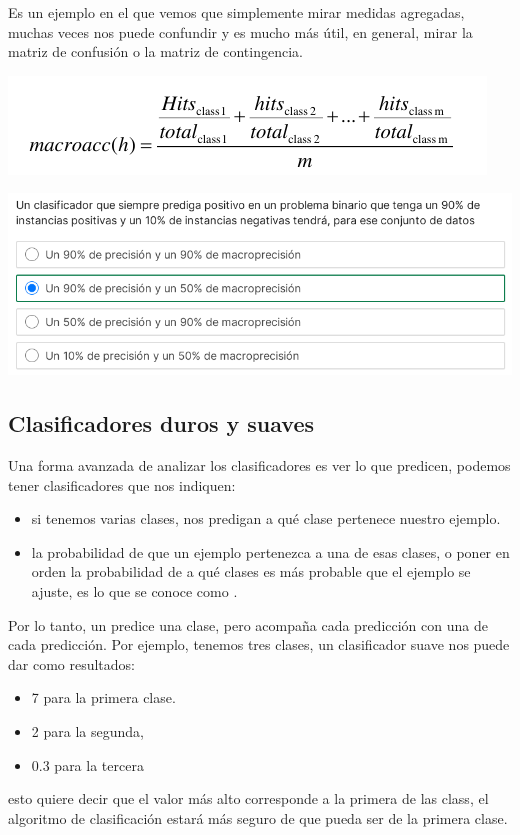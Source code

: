 Es un ejemplo en el que vemos que simplemente mirar medidas agregadas, muchas veces nos puede confundir y es mucho más útil, en general, mirar la matriz de confusión o la matriz de contingencia.
\begin{center}
    \includegraphics[scale=.75]{images/mod02-15.png}
\end{center}

\begin{center}
    \includegraphics[scale=.75]{images/mod02-16.png}
\end{center}

\subsection{Clasificadores duros y suaves}

Una forma avanzada de analizar los clasificadores es ver lo que predicen, podemos tener clasificadores que nos indiquen:
\begin{itemize}
    \item si tenemos varias clases, nos predigan a qué clase pertenece nuestro ejemplo.
    \item la probabilidad de que un ejemplo pertenezca a una de esas clases, o poner en orden la probabilidad de a qué clases es más probable que el ejemplo se ajuste, es lo que se conoce como . 
\end{itemize}

Por lo tanto, un  predice una clase, pero acompaña cada predicción con una  de cada predicción. Por ejemplo, tenemos tres clases, un clasificador suave nos puede dar como resultados:
\begin{itemize}
    \item 7 para la primera clase.
    \item 2 para la segunda,
    \item 0.3 para la tercera
\end{itemize}
esto quiere decir que el valor más alto corresponde a la primera de las class, el algoritmo de clasificación estará más seguro de que pueda ser de la primera clase.

